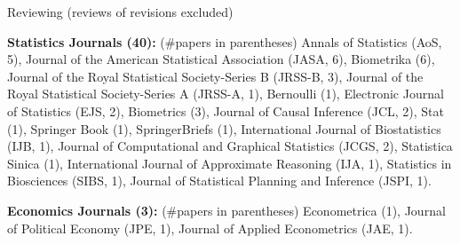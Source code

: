 \documentclass{article}
\begin{document}








\vspace{3mm}
\begin{large}
\noindent Reviewing (reviews of revisions excluded)
\end{large}

\vspace{2mm}
\noindent \textbf{Statistics Journals (40): }(\#papers in parentheses) Annals of Statistics (AoS, 5), Journal of the American Statistical Association (JASA, 6), Biometrika (6), Journal of the Royal Statistical Society-Series B (JRSS-B, 3), Journal of the Royal Statistical Society-Series A (JRSS-A, 1), Bernoulli (1), Electronic Journal of Statistics (EJS, 2), Biometrics (3), Journal of Causal Inference (JCL, 2), Stat (1), Springer Book (1), SpringerBriefs (1), International Journal of Biostatistics (IJB, 1), Journal of Computational and Graphical Statistics (JCGS, 2), Statistica Sinica (1), International Journal of Approximate Reasoning (IJA, 1), Statistics in Biosciences (SIBS, 1), Journal of Statistical Planning and Inference (JSPI, 1).

\vspace{2mm}
\noindent \textbf{Economics Journals (3): }(\#papers in parentheses) Econometrica (1), Journal of Political Economy (JPE, 1), Journal of Applied Econometrics (JAE, 1).
\end{document}
